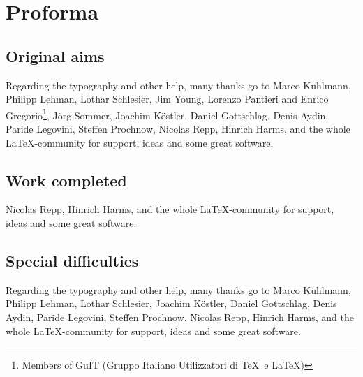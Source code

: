 
\bigskip

\begingroup
\let\clearpage\relax
\let\cleardoublepage\relax
\let\cleardoublepage\relax
\chapter*{Proforma}

\section*{Original aims}

Regarding the typography and other help, many thanks go to Marco 
Kuhlmann, Philipp Lehman, Lothar Schlesier, Jim Young, Lorenzo 
Pantieri and Enrico Gregorio\footnote{Members of GuIT (Gruppo 
Italiano Utilizzatori di \TeX\ e \LaTeX )}, J\"org Sommer, 
Joachim K\"ostler, Daniel Gottschlag, Denis Aydin, Paride 
Legovini, Steffen Prochnow, Nicolas Repp, Hinrich Harms, 
and the whole \LaTeX-community for support, ideas and some great software.

\section*{Work completed}

Nicolas Repp, Hinrich Harms, 
and the whole \LaTeX-community for support, ideas and some great software.

\section*{Special difficulties}

Regarding the typography and other help, many thanks go to Marco 
Kuhlmann, Philipp Lehman, Lothar Schlesier, Joachim K\"ostler, Daniel Gottschlag, Denis Aydin, Paride 
Legovini, Steffen Prochnow, Nicolas Repp, Hinrich Harms, 
and the whole \LaTeX-community for support, ideas and some great software.

\endgroup



